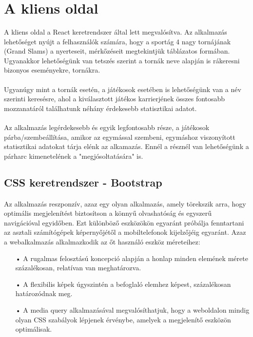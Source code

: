 \section{A kliens oldal}
\paragraph{}
A kliens oldal a  React keretrendszer által lett megvalósítva. Az alkalmazás lehetőséget nyújt a felhasználók számára, hogy a sportág 4 nagy tornájának (Grand Slams) a nyerteseit, mérkőzéseit megtekintjük táblázatos formában. Ugyanakkor lehetőségünk van tetszés szerint a tornák neve alapján is rákeresni bizonyos eseményekre, tornákra. 
\paragraph{}
Ugyanúgy mint a tornák esetén, a játékosok esetében is lehetőségünk van a név szerinti keresésre, ahol a kiválasztott játékos karrierjének összes fontosabb mozzanatáról találhatunk néhány érdekesebb statisztikai adatot.
\paragraph{}
Az alkalmazás legérdekesebb és egyik legfontosabb része, a játékosok párba/szembeállítása, amikor az egymással szembeni, egymáshoz viszonyított statisztikai adatokat tárja elénk az alkamazás. Ennél a résznél van lehetőségünk a párharc kimenetelének a "megjósoltatására" is.

\subsection{CSS keretrendszer - Bootstrap}
\paragraph{}
Az alkalmazás reszponzív, azaz egy olyan alkalmazás, amely törekszik arra, hogy optimális megjelenítést biztosítson a könnyű olvashatóság és egyszerű navigációval egyidőben. Ezt különböző eszközökön egyaránt próbálja fenntartani az asztali számítógépek képernyőjétől a mobiltelefonok kijelzőjéig egyaránt. Azaz a webalkalmazás alkalmazkodik az őt használó eszköz méreteihez:
\begin{enumerate}
\item[•] A rugalmas felosztású koncepció alapján a honlap minden elemének mérete százalékosan, relatívan van meghatározva.
\item[•] A flexibilis képek úgyszintén a befoglaló elemhez képest, százalékosan határozódnak meg.
\item[•] A media query alkalmazásával megvalósíthatjuk, hogy a weboldalon mindig olyan CSS szabályok lépjenek érvénybe, amelyek a megjelenítő eszközön optimálisak.
\end{enumerate}

